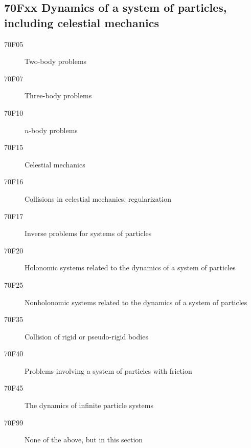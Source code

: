\subsection*{70Fxx  Dynamics of a system of particles, including celestial mechanics }\label{70Fxx}
\begin{description}  
\item [70F05]\label{70F05} Two-body problems
\item [70F07]\label{70F07} Three-body problems
\item [70F10]\label{70F10} $n$-body problems
\item [70F15]\label{70F15} Celestial mechanics
\item [70F16]\label{70F16} Collisions in celestial mechanics, regularization
\item [70F17]\label{70F17} Inverse problems for systems of particles
\item [70F20]\label{70F20} Holonomic systems related to the dynamics of a system of particles
\item [70F25]\label{70F25} Nonholonomic systems related to the dynamics of a system of particles
\item [70F35]\label{70F35} Collision of rigid or pseudo-rigid bodies
\item [70F40]\label{70F40} Problems involving a system of particles with friction
\item [70F45]\label{70F45} The dynamics of infinite particle systems
\item [70F99]\label{70F99} None of the above, but in this section
\end{description}
